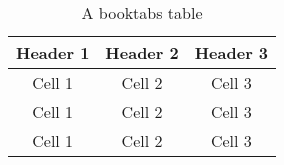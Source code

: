 \documentclass[12pt, a4paper]{article}
\begin{document}
\kant[8]

\begin{table}[htbp]
    \centering
    \begin{tabular}{c c c}
        \toprule
       Header 1 & Header 2 & Header 3  \\
       \midrule
        Cell 1 & Cell 2 & Cell 3 \\ 
        Cell 1 & Cell 2 & Cell 3 \\
        \cmidrule{2-3}
        Cell 1 & Cell 2 & Cell 3 \\
        \bottomrule
    \end{tabular}
    \caption{A booktabs table}
    \label{tab:booktabs}
\end{table}
\end{document}
